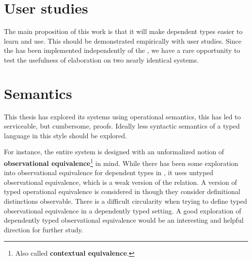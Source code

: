 \section{User studies}
 
The main proposition of this work is that it will make dependent types easier to learn and use.
This should be demonstrated empirically with user studies.
Since the \slang{} has been implemented independently of the \clang{}, we have a rare opportunity to test the usefulness of elaboration on two nearly identical systems.
 
\section{Semantics}
 
This thesis has explored its systems using operational semantics, this has led to serviceable, but cumbersome, proofs.
Ideally less syntactic semantics of a typed language in this style should be explored.
 
For instance, the entire system is designed with an unformalized notion of \textbf{observational equivalence}\footnote{Also called \textbf{contextual equivalence}.} in mind.
While there has been some exploration into observational equivalence for dependent types in \cite{sjoberg2015dependently,jia2010dependent}, it uses untyped observational equivalence, which is a weak version of the relation.
A version of typed operational equivalence is considered in \cite{VAKAR2018401} though they consider definitional distinctions observable. %
There is a difficult circularity when trying to define typed observational equivalence in a dependently typed setting.
A good exploration of dependently typed observational equivalence would be an interesting and helpful direction for further study.

